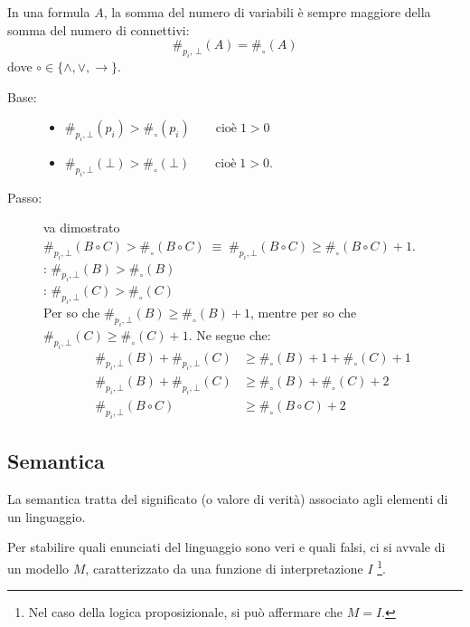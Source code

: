 \documentclass[a4paper,12pt]{article}
\newcommand{\latinmodern}[1]{\text{#1}}
\newcommand{\latinmath}[1]{\text{\latinmodern{#1}}} %
\begin{document}
\begin{exm}
	 In una formula $A$, la somma del numero di variabili è sempre maggiore della somma del numero di connettivi:
	$$\#_{p_i, \, \bot}(A) = \#_{\circ}(A)$$
	dove $\circ \in \{\land, \lor, \to\}$.
	\begin{dimo}
		 \phantom{ciao}
		\begin{description}
			\item [Base:] \phantom{ciao}
			      \begin{itemize}
				      \item $\#_{p_i, \bot}(p_i) > \#_{\circ}(p_i) \qquad \text{cioè} \; 1>0$
				      \item $\#_{p_i, \bot}(\bot) > \#_{\circ}(\bot) \qquad \text{cioè} \; 1>0$.
			      \end{itemize}
			\item [Passo:] va dimostrato $\#_{p_i, \bot}(B \circ C) > \#_{\circ}(B \circ C) \; \equiv \; \#_{p_i, \bot}(B \circ C) \geq \#_{\circ}(B \circ C) +1$. \\
			      \latinmath{IH1}: $\#_{p_i, \bot}(B) > \#_{\circ}(B)$ \\
			      \latinmath{IH2}: $\#_{p_i, \bot}(C) > \#_{\circ}(C)$ \\
			      Per \latinmath{IH1} so che $\#_{p_i, \bot}(B) \geq \#_{\circ}(B) +1$, mentre per \latinmath{IH2} so che $\#_{p_i, \bot}(C) \geq \#_{\circ}(C) +1$. Ne segue che:
			      $$\begin{aligned}
					      \#_{p_i, \bot}(B) + \#_{p_i, \bot}(C) & \geq \#_{\circ}(B) +1 + \#_{\circ}(C) +1 \\
					      \#_{p_i, \bot}(B) + \#_{p_i, \bot}(C) & \geq \#_{\circ}(B) + \#_{\circ}(C) +2    \\
					      \#_{p_i, \bot}(B \circ C)             & \geq \#_{\circ}(B \circ C) +2
				      \end{aligned}$$
		\end{description}
	\end{dimo}
\end{exm}

\newpage
\subsection{Semantica}
\noindent La semantica tratta del significato (o valore di verità) associato agli elementi di un linguaggio.

Per stabilire quali enunciati del linguaggio sono veri e quali falsi, ci si avvale di un modello $M$, caratterizzato da una funzione di interpretazione $I$ \footnote{Nel caso della logica proposizionale, si può affermare che $M = I$.}. \\
\end{document}
